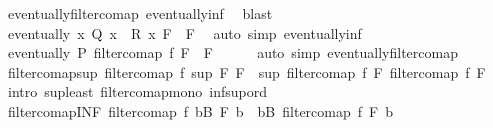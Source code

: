 \begin{isabellebody}
\ eventually{\isacharunderscore}{\kern0pt}filtercomap\ eventually{\isacharunderscore}{\kern0pt}inf\ \isamarkupfalse%
\ blast\isanewline
\ \ \isamarkupfalse%
\ {\isacharasterisk}{\kern0pt}\ \isamarkupfalse%
\ {\isachardoublequoteopen}eventually\ {\isacharparenleft}{\kern0pt}{\isasymlambda}x{\isachardot}{\kern0pt}\ Q\ x\ {\isasymand}\ R\ x{\isacharparenright}{\kern0pt}\ {\isacharparenleft}{\kern0pt}F{}\ {\isasymsqinter}\ F{}{\isacharparenright}{\kern0pt}{\isachardoublequoteclose}\ \isamarkupfalse%
\ {\isacharparenleft}{\kern0pt}auto\ simp{\isacharcolon}{\kern0pt}\ eventually{\isacharunderscore}{\kern0pt}inf{\isacharparenright}{\kern0pt}\isanewline
\ \ \isamarkupfalse%
\ {\isacharasterisk}{\kern0pt}\ \isamarkupfalse%
\ {\isachardoublequoteopen}eventually\ P\ {\isacharparenleft}{\kern0pt}filtercomap\ f\ {\isacharparenleft}{\kern0pt}F{}\ {\isasymsqinter}\ F{}{\isacharparenright}{\kern0pt}{\isacharparenright}{\kern0pt}{\isachardoublequoteclose}\isanewline
\ \ \ \ \isamarkupfalse%
\ {\isacharparenleft}{\kern0pt}auto\ simp{\isacharcolon}{\kern0pt}\ eventually{\isacharunderscore}{\kern0pt}filtercomap{\isacharparenright}{\kern0pt}\isanewline
{}\isamarkupfalse%
%
\endisatagproof
{\isafoldproof}%
%
\isadelimproof
\isanewline
%
\endisadelimproof
\isanewline
{}\isamarkupfalse%
\ filtercomap{\isacharunderscore}{\kern0pt}sup{\isacharcolon}{\kern0pt}\ {\isachardoublequoteopen}filtercomap\ f\ {\isacharparenleft}{\kern0pt}sup\ F{}\ F{}{\isacharparenright}{\kern0pt}\ {\isasymge}\ sup\ {\isacharparenleft}{\kern0pt}filtercomap\ f\ F{}{\isacharparenright}{\kern0pt}\ {\isacharparenleft}{\kern0pt}filtercomap\ f\ F{}{\isacharparenright}{\kern0pt}{\isachardoublequoteclose}\isanewline
%
\isadelimproof
\ \ %
\endisadelimproof
%
\isatagproof
{}\isamarkupfalse%
\ {\isacharparenleft}{\kern0pt}intro\ sup{\isacharunderscore}{\kern0pt}least\ filtercomap{\isacharunderscore}{\kern0pt}mono\ inf{\isacharunderscore}{\kern0pt}sup{\isacharunderscore}{\kern0pt}ord{\isacharparenright}{\kern0pt}%
\endisatagproof
{\isafoldproof}%
%
\isadelimproof
\isanewline
%
\endisadelimproof
\isanewline
{}\isamarkupfalse%
\ filtercomap{\isacharunderscore}{\kern0pt}INF{\isacharcolon}{\kern0pt}\ {\isachardoublequoteopen}filtercomap\ f\ {\isacharparenleft}{\kern0pt}{\isasymSqinter}b{\isasymin}B{\isachardot}{\kern0pt}\ F\ b{\isacharparenright}{\kern0pt}\ {\isacharequal}{\kern0pt}\ {\isacharparenleft}{\kern0pt}{\isasymSqinter}b{\isasymin}B{\isachardot}{\kern0pt}\ filtercomap\ f\ {\isacharparenleft}{\kern0pt}F\ b{\isacharparenright}{\kern0pt}{\isacharparenright}{\kern0pt}{\isachardoublequoteclose}\isanewline

\end{isabellebody}
